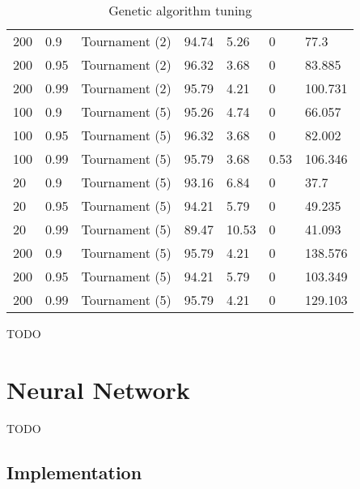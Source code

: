 \documentclass[a4paper]{article}
\begin{document}
\begin{table}[h!]
\begin{tabular}{@{}lllllll@{}}
    200             & 0.9        & Tournament (2) & 94.74         & 5.26       & 0                 & 77.3     \\
    200             & 0.95       & Tournament (2) & 96.32         & 3.68       & 0                 & 83.885   \\
    200             & 0.99       & Tournament (2) & 95.79         & 4.21       & 0                 & 100.731  \\
    100             & 0.9        & Tournament (5) & 95.26         & 4.74       & 0                 & 66.057   \\
    100             & 0.95       & Tournament (5) & 96.32         & 3.68       & 0                 & 82.002   \\
    100             & 0.99       & Tournament (5) & 95.79         & 3.68       & 0.53              & 106.346  \\
    20              & 0.9        & Tournament (5) & 93.16         & 6.84       & 0                 & 37.7     \\
    20              & 0.95       & Tournament (5) & 94.21         & 5.79       & 0                 & 49.235   \\
    20              & 0.99       & Tournament (5) & 89.47         & 10.53      & 0                 & 41.093   \\
    200             & 0.9        & Tournament (5) & 95.79         & 4.21       & 0                 & 138.576  \\
    200             & 0.95       & Tournament (5) & 94.21         & 5.79       & 0                 & 103.349  \\
    200             & 0.99       & Tournament (5) & 95.79         & 4.21       & 0                 & 129.103  \\
    \bottomrule
  \end{tabular}
  \caption{Genetic algorithm tuning}
  \label{tab:ga_tuning}
\end{table}

TODO

\section{Neural Network}

TODO

\subsection{Implementation}
\end{document}
